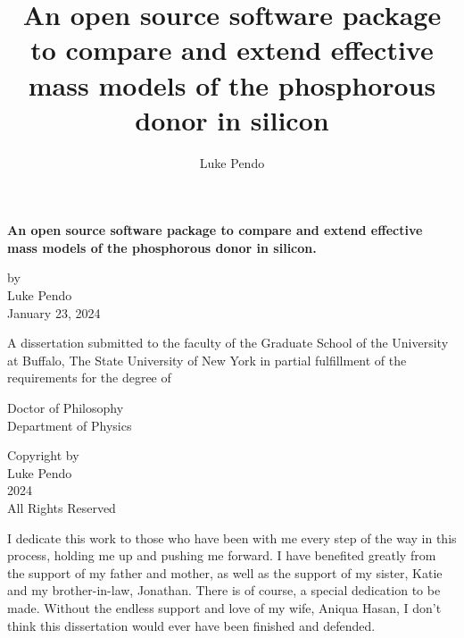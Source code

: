 \documentclass[12pt]{report}
\title{An open source software package to compare and extend effective mass models of the phosphorous donor in silicon}
\author{Luke Pendo}
\date{}
\begin{document}

\begin{titlepage}
    \begin{center}
        \vspace*{1cm}

        \textbf{ 
            An open source software package to compare and extend effective
            mass models of the phosphorous donor in silicon.
        }

        \vfill

        by
        \\
        Luke Pendo
        \\
        January 23, 2024

        \vfill

        \begin{singlespace}
            A dissertation submitted to the faculty of the Graduate School of
            the University at Buffalo, The State University of New York in
            partial fulfillment of the requirements for the degree of

            \vspace{0.5cm}
            Doctor of Philosophy \\
            Department of Physics
        \end{singlespace}
    \end{center}
\end{titlepage}

\addtocounter{page}{1}

\null\vfill
\noindent
\begin{center}
    Copyright by \\
    Luke Pendo \\
    2024 \\
    All Rights Reserved
\end{center}

\newpage

\null\vfill
\noindent
\begin{center}
    \begin{singlespace}
        I dedicate this work to those who have been with me every step of the
        way in this process, holding me up and pushing me forward. I have
        benefited greatly from the support of my father and mother, as well as
        the support of my sister, Katie and my brother-in-law, Jonathan. There
        is of course, a special dedication to be made. Without the endless
        support and love of my wife, Aniqua Hasan, I don't think this
        dissertation would ever have been finished and defended.
    \end{singlespace}
\end{center}
\vfill
\end{document}
